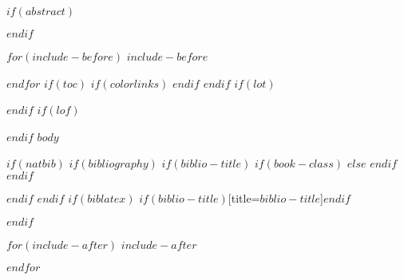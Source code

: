 \documentclass[10pt, a4paper]{article}
\newif\IfInSansMode
\begin{document}

\thispagestyle{empty}
\tableofcontents
\newpage


$if(abstract)$
\begin{abstract}
$abstract$
\end{abstract}
$endif$

$for(include-before)$
$include-before$

$endfor$
$if(toc)$
{
$if(colorlinks)$
\hypersetup{linkcolor=$if(toccolor)$$toccolor$$else$black$endif$}
$endif$
\setcounter{tocdepth}{$toc-depth$}
\tableofcontents
}
$endif$
$if(lot)$
\listoftables
$endif$
$if(lof)$
\listoffigures
$endif$
$body$

$if(natbib)$
$if(bibliography)$
$if(biblio-title)$
$if(book-class)$
\renewcommand\bibname{$biblio-title$}
$else$
\renewcommand\refname{$biblio-title$}
$endif$
$endif$


$endif$
$endif$
$if(biblatex)$
\printbibliography$if(biblio-title)$[title=$biblio-title$]$endif$

$endif$




$for(include-after)$
$include-after$

$endfor$
\end{document}
